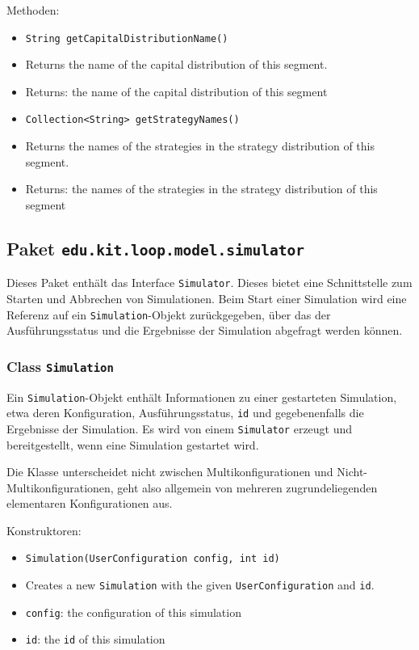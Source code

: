 \documentclass[parskip=full,11pt]{scrartcl}
\begin{document}
Methoden:
\begin{itemize}\itemsep -10pt
\item \texttt{String getCapitalDistributionName()}
\item[] Returns the name of the capital distribution of this segment.
\item[] Returns: the name of the capital distribution of this segment

\item \texttt{Collection<String> getStrategyNames()}
\item[] Returns the names of the strategies in the strategy distribution of this segment.
\item[] Returns: the names of the strategies in the strategy distribution of this segment
\end{itemize}


\subsection{Paket \texttt{edu.kit.loop.model.simulator}}
Dieses Paket enthält das Interface \texttt{Simulator}. Dieses bietet eine Schnittstelle zum Starten und Abbrechen von Simulationen. Beim Start einer Simulation wird eine Referenz auf ein \texttt{Simulation}-Objekt zurückgegeben, über das der Ausführungsstatus und die Ergebnisse der Simulation abgefragt werden können.

\subsubsection{Class \texttt{Simulation}}
Ein \texttt{Simulation}-Objekt enthält Informationen zu einer gestarteten Simulation, etwa deren Konfiguration, Ausführungsstatus, \texttt{id} und gegebenenfalls die Ergebnisse der Simulation. Es wird von einem \texttt{Simulator} erzeugt und bereitgestellt, wenn eine Simulation gestartet wird.

Die Klasse unterscheidet nicht zwischen Multikonfigurationen und Nicht-Multikonfigurationen, geht also allgemein von mehreren zugrundeliegenden elementaren Konfigurationen aus.

Konstruktoren:
\begin{itemize} \itemsep -10pt
\item \texttt{Simulation(UserConfiguration config, int id)}
\item[] Creates a new \texttt{Simulation} with the given \texttt{UserConfiguration} and \texttt{id}.
\item[] \texttt{config}: the configuration of this simulation
\item[] \texttt{id}: the \texttt{id} of this simulation
\end{itemize}
\end{document}
